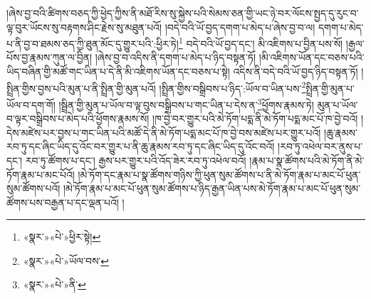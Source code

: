 །ཞེས་བྱ་བའི་ཚིགས་བཅད་ཀྱི་ཕྱེད་ཀྱིས་ནི་མཐོ་རིས་སུ་སྐྱེས་པའི་སེམས་ཅན་གྱི་ཡང་ཉེ་བར་ལོངས་སྤྱད་དུ་རུང་བ་ལྟ་བུར་ཡོངས་སུ་བརྟགས་ཤིང་རྗེས་སུ་མཐུན་པའོ། །བདེ་བའི་ཡོ་བྱད་དགག་པ་མེད་པ་ཞེས་བྱ་བ་ལ། དགག་པ་མེད་པ་ནི་བྱ་བ་ཐམས་ཅད་ཀྱི་ཐུན་མོང་དུ་གྱུར་པའི་:ཕྱིར་ཏེ།\footnote{«སྣར་»«པེ་»ཕྱིར་སྟེ།} བདེ་བའི་ཡོ་བྱད་དང་། མི་འཇིགས་པ་བྱིན་པས་སོ། །རྒྱལ་པོས་བྱ་རྣམས་ཀུན་ལ་བྱིན། །ཞེས་བྱ་བ་འདིས་ནི་དགག་པ་མེད་པ་ཉིད་བསྟན་ཏོ། །མི་འཇིགས་ཡོན་དང་བཅས་པའི་ཡིད་བཞིན་གྱི་མཚོ་གང་ཡིན་པ་དེ་ནི་མི་འཇིགས་ཡོན་དང་བཅས་པ་སྟེ། འདིས་ནི་བདེ་བའི་ཡོ་བྱད་ཉིད་བསྟན་ཏོ། །སྤྲིན་གྱིས་བྱས་པའི་མུན་པ་ནི་སྤྲིན་གྱི་མུན་པའོ། །སྤྲིན་གྱིས་བསྒྲིབས་པ་ཉིད་:ཡོལ་བ་ཡིན་པས་\footnote{«སྣར་»«པེ་»ཡོལ་བས་}སྤྲིན་གྱི་མུན་པ་ཡོལ་བ་དག་གོ། །སྦྲིན་གྱི་མུན་པ་ཡོལ་བ་ལྟ་བུས་བསྒྲིབས་པ་གང་ཡིན་པ་དེས་ན་\footnote{«སྣར་»«པེ་»ནི་}ཕྱོགས་རྣམས་ཏེ། མུན་པ་ཡོལ་བ་ལྟར་བསྒྲིབས་པ་མེད་པའི་ཕྱོགས་རྣམས་སོ། །ཁ་བྱེ་བར་གྱུར་པའི་མེ་ཏོག་པདྨ་ནི་མེ་ཏོག་པདྨ་མང་པོ་ཁ་བྱེ་བའོ། །དེས་མཛེས་པར་བྱས་པ་གང་ཡིན་པའི་མཚོ་དེ་ནི་མེ་ཏོག་པདྨ་མང་པོ་ཁ་བྱེ་བས་མཛེས་པར་གྱུར་པའོ། །ཆུ་རྣམས་རབ་ཏུ་དང་ཞིང་ཡིད་དུ་འོང་བར་གྱུར་པ་ནི་ཆུ་རྣམས་རབ་ཏུ་དང་ཞིང་ཡིད་དུ་འོང་བའོ། །རབ་ཏུ་འཕེལ་བར་ནུས་པ་དང་། རབ་ཏུ་ཚོགས་པ་དང་། རྒྱས་པར་གྱུར་པའི་འོད་ཟེར་རབ་ཏུ་འཕེལ་བའོ། །རྣམ་པ་སྣ་ཚོགས་པའི་མེ་ཏོག་ནི་མེ་ཏོག་རྣམ་པ་མང་པོའོ། །མེ་ཏོག་དང་རྣམ་པ་སྣ་ཚོགས་གཉིས་ཀྱི་ཕུན་སུམ་ཚོགས་པ་ནི་མེ་ཏོག་རྣམ་པ་མང་པོ་ཕུན་སུམ་ཚོགས་པའོ། །མེ་ཏོག་རྣམ་པ་མང་པོ་ཕུན་སུམ་ཚོགས་པ་ཉིད་རྒྱན་ཡིན་པས་མེ་ཏོག་རྣམ་པ་མང་པོ་ཕུན་སུམ་ཚོགས་པས་བརྒྱན་པ་དང་ལྡན་པའོ། །
